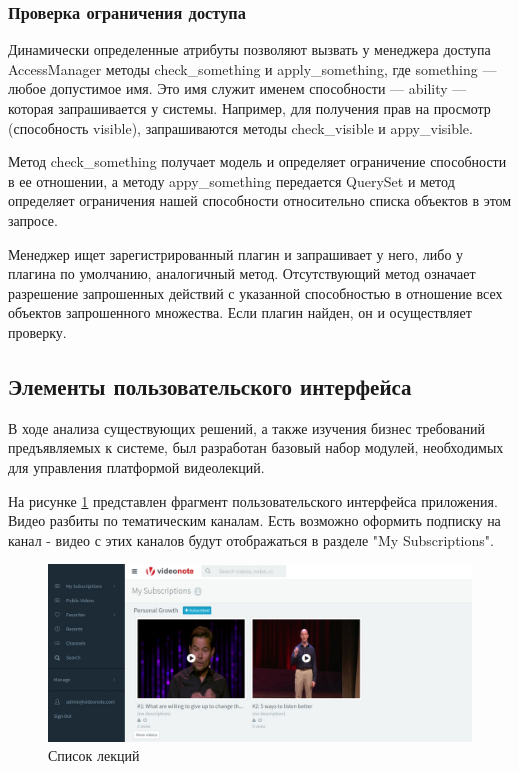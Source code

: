 \FloatBarrier

\subsubsection{Проверка ограничения доступа}

Динамически определенные атрибуты позволяют вызвать у менеджера доступа AccessManager методы check\_something и apply\_something,
где something — любое допустимое имя. Это имя служит именем способности — ability — которая запрашивается у системы.
Например, для получения прав на просмотр (способность visible), запрашиваются методы check\_visible и appy\_visible.

Метод check\_something получает модель и определяет ограничение способности в ее отношении, а методу appy\_something
передается QuerySet и метод определяет ограничения нашей способности относительно списка объектов в этом запросе.

Менеджер ищет зарегистрированный плагин и запрашивает у него, либо у плагина по умолчанию, аналогичный метод.
Отсутствующий метод означает разрешение запрошенных действий с указанной способностью в отношение всех объектов
запрошенного множества. Если плагин найден, он и осуществляет проверку.

\subsection{Элементы пользовательского интерфейса}

В ходе анализа существующих решений, а также изучения бизнес требований предъявляемых к системе,
был разработан базовый набор модулей, необходимых для управления платформой видеолекций.

На рисунке \ref{user-interface} представлен фрагмент пользовательского интерфейса приложения.
Видео разбиты по тематическим каналам. Есть возможно оформить подписку на канал - видео с этих
каналов будут отображаться в разделе "My Subscriptions".

\begin{figure}[H]
  \centering
  \includegraphics[width=1\textwidth]{images/user-interface.jpg}
  \caption{Список лекций\label{user-interface}}
\end{figure}

